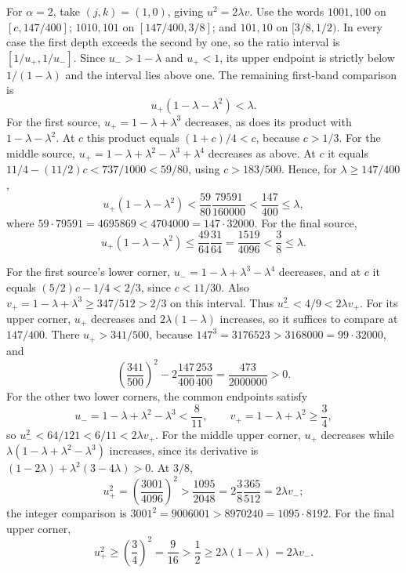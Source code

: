For $\alpha=2$, take $(j,k)=(1,0)$, giving $u^2=2\lambda v$.
Use the words $1001,100$ on $[c,147/400]$;
$1010,101$ on $[147/400,3/8]$; and $101,10$ on $[3/8,1/2)$.
In every case the first depth exceeds the second by one, so the ratio
interval is $[1/u_+,1/u_-]$. Since $u_->1-\lambda$ and $u_+<1$,
its upper endpoint is strictly below $1/(1-\lambda)$ and the interval
lies above one. The remaining first-band comparison is
\[
 u_+(1-\lambda-\lambda^2)<\lambda.
\]
For the first source, $u_+=1-\lambda+\lambda^3$ decreases, as does its
product with $1-\lambda-\lambda^2$. At $c$ this product equals
$(1+c)/4<c$, because $c>1/3$.
For the middle source,
$u_+=1-\lambda+\lambda^2-\lambda^3+\lambda^4$ decreases as above.
At $c$ it equals $11/4-(11/2)c<737/1000<59/80$, using $c>183/500$.
Hence, for $\lambda\ge147/400$,
\[
 u_+(1-\lambda-\lambda^2)
 <\frac{59}{80}\frac{79591}{160000}<\frac{147}{400}\le\lambda,
\]
where $59\cdot79591=4695869<4704000=147\cdot32000$.
For the final source,
\[
 u_+(1-\lambda-\lambda^2)
 \le\frac{49}{64}\frac{31}{64}
 =\frac{1519}{4096}<\frac38\le\lambda.
\]

For the first source's lower corner,
$u_-=1-\lambda+\lambda^3-\lambda^4$ decreases, and at $c$ it equals
$(5/2)c-1/4<2/3$, since $c<11/30$.
Also $v_+=1-\lambda+\lambda^3\ge347/512>2/3$ on this interval.
Thus $u_-^2<4/9<2\lambda v_+$.
For its upper corner, $u_+$ decreases and $2\lambda(1-\lambda)$ increases,
so it suffices to compare at $147/400$.
There $u_+>341/500$, because
$147^3=3176523>3168000=99\cdot32000$, and
\[
 \left(\frac{341}{500}\right)^2
 -2\frac{147}{400}\frac{253}{400}
 =\frac{473}{2000000}>0.
\]
For the other two lower corners, the common endpoints satisfy
\[
 u_-=1-\lambda+\lambda^2-\lambda^3<\frac8{11},\qquad
 v_+=1-\lambda+\lambda^2\ge\frac34,
\]
so $u_-^2<64/121<6/11<2\lambda v_+$.
For the middle upper corner, $u_+$ decreases while
$\lambda(1-\lambda+\lambda^2-\lambda^3)$ increases, since its derivative is
$(1-2\lambda)+\lambda^2(3-4\lambda)>0$.
At $3/8$,
\[
 u_+^2=\left(\frac{3001}{4096}\right)^2
 >\frac{1095}{2048}=2\frac38\frac{365}{512}=2\lambda v_-;
\]
the integer comparison is $3001^2=9006001>8970240=1095\cdot8192$.
For the final upper corner,
\[
 u_+^2\ge\left(\frac34\right)^2=\frac9{16}
 >\frac12\ge2\lambda(1-\lambda)=2\lambda v_-.
\]

